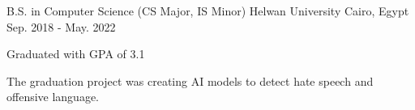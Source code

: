

\begin{cventries}

  \cventry
    {B.S. in Computer Science (CS Major, IS Minor)} %
    {Helwan University} %
    {Cairo, Egypt} %
    {Sep. 2018 - May. 2022} %
    {
      \begin{cvitems} %
        \item {Graduated with GPA of 3.1}
        \item {The graduation project was creating AI models to detect hate speech and offensive language.}
      \end{cvitems}
    }

\end{cventries}
